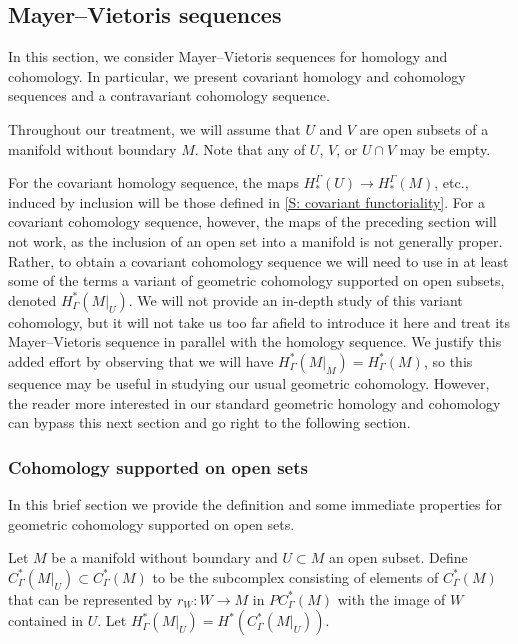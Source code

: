\subsection{Mayer--Vietoris sequences}\label{S: MV}

In this section, we consider Mayer--Vietoris sequences for homology and cohomology.
In particular, we present covariant homology and cohomology sequences and a contravariant cohomology sequence.

Throughout our treatment, we will assume that $U$ and $V$ are open subsets of a manifold without boundary $M$.
Note that any of $U$, $V$, or $U \cap V$ may be empty.

For the covariant homology sequence, the maps $H_*^\Gamma(U) \to H_*^\Gamma(M)$, etc., induced by inclusion will be those defined in \cref{S: covariant functoriality}.
For a covariant cohomology sequence, however, the maps of the preceding section will not work, as the inclusion of an open set into a manifold is not generally proper.
Rather, to obtain a covariant cohomology sequence we will need to use in at least some of the terms a variant of geometric cohomology supported on open subsets, denoted $H^*_\Gamma(M|_U)$.
We will not provide an in-depth study of this variant cohomology, but it will not take us too far afield to introduce it here and treat its Mayer--Vietoris sequence in parallel with the homology sequence.
We justify this added effort by observing that we will have $H^*_\Gamma(M|_M) = H^*_\Gamma(M)$, so this sequence may be useful in studying our usual geometric cohomology.
However, the reader more interested in our standard geometric homology and cohomology can bypass this next section and go right to the following section.


\subsubsection{Cohomology supported on open sets}

In this brief section we provide the definition and some immediate properties for geometric cohomology supported on open sets.

\begin{definition}
	Let $M$ be a manifold without boundary and $U \subset M$ an open subset.
	Define $C_\Gamma^*(M|_U) \subset C_\Gamma^*(M)$ to be the subcomplex consisting of elements of $C_\Gamma^*(M)$ that can be represented by $r_W \colon W \to M$ in $PC^*_\Gamma(M)$ with the image of $W$ contained in $U$.
	Let $H_\Gamma^*(M|_U) = H^*(C_\Gamma^*(M|_U))$.
\end{definition}

